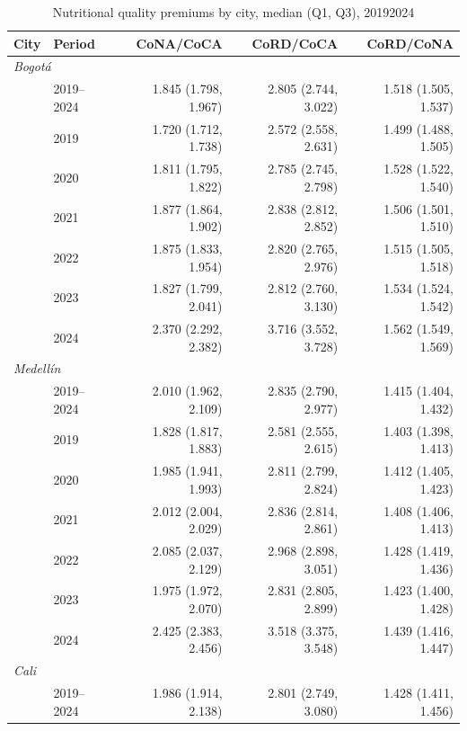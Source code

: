 \documentclass[Afour, sageh,times]{sagej}
\begin{document}
\begin{table}[htbp]
\centering
\begingroup
\fontsize{7}{8.5}\selectfont
\setlength{\tabcolsep}{3.5pt}
\renewcommand{\arraystretch}{0.95}
\caption{Nutritional quality premiums by city, median (Q1, Q3), 2019\textendash{}2024}
\label{tab:cost_premiums_median}
\begin{tabular}{llrrr}
\toprule
City & Period & CoNA/CoCA & CoRD/CoCA & CoRD/CoNA \\
\midrule
\multicolumn{5}{l}{\textit{Bogotá}} \\
 & 2019–2024 & 1.845 (1.798, 1.967) & 2.805 (2.744, 3.022) & 1.518 (1.505, 1.537) \\
 & 2019      & 1.720 (1.712, 1.738) & 2.572 (2.558, 2.631) & 1.499 (1.488, 1.505) \\
 & 2020      & 1.811 (1.795, 1.822) & 2.785 (2.745, 2.798) & 1.528 (1.522, 1.540) \\
 & 2021      & 1.877 (1.864, 1.902) & 2.838 (2.812, 2.852) & 1.506 (1.501, 1.510) \\
 & 2022      & 1.875 (1.833, 1.954) & 2.820 (2.765, 2.976) & 1.515 (1.505, 1.518) \\
 & 2023      & 1.827 (1.799, 2.041) & 2.812 (2.760, 3.130) & 1.534 (1.524, 1.542) \\
 & 2024      & 2.370 (2.292, 2.382) & 3.716 (3.552, 3.728) & 1.562 (1.549, 1.569) \\
\midrule
\multicolumn{5}{l}{\textit{Medellín}} \\
 & 2019–2024 & 2.010 (1.962, 2.109) & 2.835 (2.790, 2.977) & 1.415 (1.404, 1.432) \\
 & 2019      & 1.828 (1.817, 1.883) & 2.581 (2.555, 2.615) & 1.403 (1.398, 1.413) \\
 & 2020      & 1.985 (1.941, 1.993) & 2.811 (2.799, 2.824) & 1.412 (1.405, 1.423) \\
 & 2021      & 2.012 (2.004, 2.029) & 2.836 (2.814, 2.861) & 1.408 (1.406, 1.413) \\
 & 2022      & 2.085 (2.037, 2.129) & 2.968 (2.898, 3.051) & 1.428 (1.419, 1.436) \\
 & 2023      & 1.975 (1.972, 2.070) & 2.831 (2.805, 2.899) & 1.423 (1.400, 1.428) \\
 & 2024      & 2.425 (2.383, 2.456) & 3.518 (3.375, 3.548) & 1.439 (1.416, 1.447) \\
\midrule
\multicolumn{5}{l}{\textit{Cali}} \\
 & 2019–2024 & 1.986 (1.914, 2.138) & 2.801 (2.749, 3.080) & 1.428 (1.411, 1.456) \\

\end{tabular}
\end{table}
\end{document}
